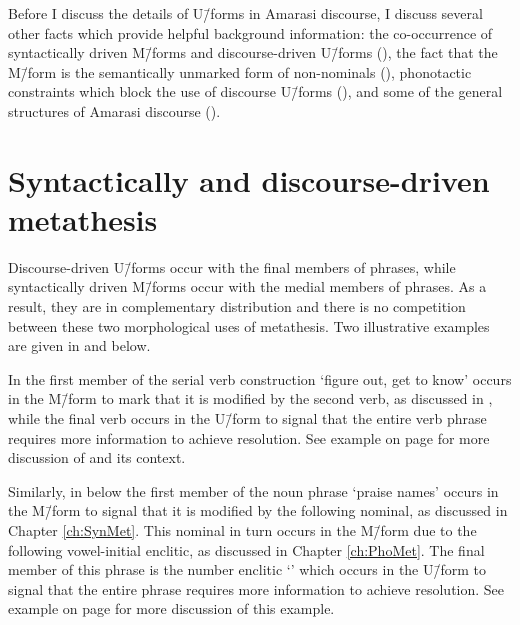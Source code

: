 Before I discuss the details of U\=/forms in Amarasi discourse,
I discuss several other facts which provide helpful background information:
the co-occurrence of syntactically driven M\=/forms
and discourse-driven U\=/forms (),
the fact that the M\=/form is the semantically
unmarked form of non-nominals (),
phonotactic constraints which block the use
of discourse U\=/forms (),
and some of the general structures of Amarasi discourse ().

\section{Syntactically and discourse-driven metathesis}\label{sec:SynDisDriMet}
Discourse-driven U\=/forms occur with
the final members of phrases, while syntactically driven
M\=/forms occur with the medial members of phrases.
As a result, they are in complementary distribution and 
there is no competition between these two morphological uses of metathesis.
Two illustrative examples are given in 
and  below.

In  the first member of the serial verb
construction  `figure out, get to know'
occurs in the M\=/form to mark that
it is modified by the second verb, as discussed in ,
while the final verb occurs in the U\=/form
to signal that the entire verb phrase requires more information to achieve resolution.
See example  on page \pageref{ex:160326, 5.37-5.45}
for more discussion of  and its context.

\begin{exe}
	\label{ex2:160326, 5.37}
\end{exe}

Similarly, in  below the first member
of the noun phrase  `praise names' occurs in the M\=/form to signal
that it is modified by the following nominal,
as discussed in Chapter \ref{ch:SynMet}.
This nominal in turn occurs in the M\=/form due to the following
vowel-initial enclitic, as discussed in Chapter \ref{ch:PhoMet}.
The final member of this phrase is the number enclitic  `{\ein}'
which occurs in the U\=/form to signal that the entire phrase requires
more information to achieve resolution.
See example  on page \pageref{ex:160326, 18.26}
for more discussion of this example.


